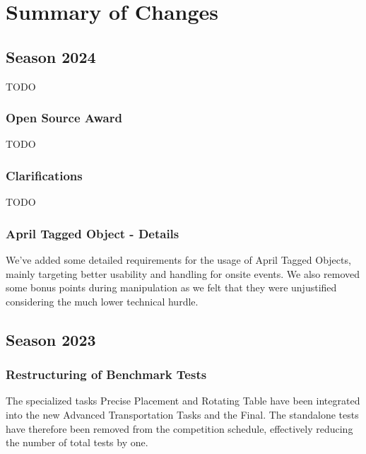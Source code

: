 
\chapter{Summary of Changes}

\begin{comment}
This chapter provides an overview for experienced teams that know the rules and just need an update on what is new for the specific year. 
All new teams are strongly advised to read the whole rule book thoroughly.
\end{comment}

\section{Season 2024}

TODO

\subsection{Open Source Award}

TODO

\subsection{Clarifications}

TODO

\subsection{April Tagged Object - Details}

We've added some detailed requirements for the usage of April Tagged Objects,
mainly targeting better usability and handling for onsite events.
We also removed some bonus points during manipulation as we felt that they were unjustified
considering the much lower technical hurdle.

\section{Season 2023}

\subsection{Restructuring of Benchmark Tests}

The specialized tasks Precise Placement and Rotating Table have been integrated into the new Advanced Transportation Tasks and the Final.
The standalone tests have therefore been removed from the competition schedule, effectively reducing the number of total tests by one.

